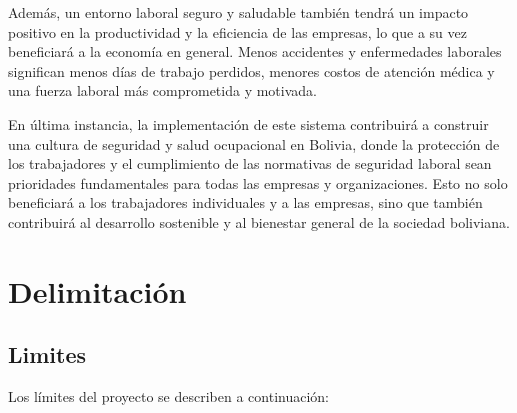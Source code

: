 Además, un entorno laboral seguro y saludable también tendrá un impacto positivo en la productividad y la eficiencia de las empresas, lo que a su vez beneficiará a la economía en general. Menos accidentes y enfermedades laborales significan menos días de trabajo perdidos, menores costos de atención médica y una fuerza laboral más comprometida y motivada.

En última instancia, la implementación de este sistema contribuirá a construir una cultura de seguridad y salud ocupacional en Bolivia, donde la protección de los trabajadores y el cumplimiento de las normativas de seguridad laboral sean prioridades fundamentales para todas las empresas y organizaciones. Esto no solo beneficiará a los trabajadores individuales y a las empresas, sino que también contribuirá al desarrollo sostenible y al bienestar general de la sociedad boliviana.


\section{Delimitación}
\subsection{Limites}

\noindent
Los límites del proyecto se describen a continuación:


